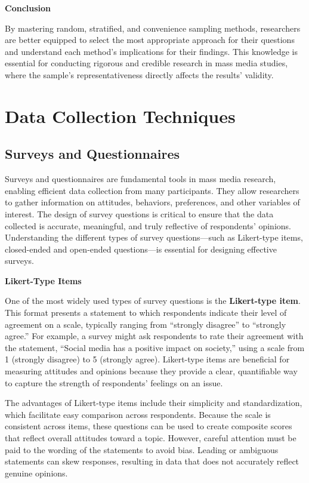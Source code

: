 \documentclass[
]{book}
\begin{document}
\textbf{Conclusion}

By mastering random, stratified, and convenience sampling methods, researchers are better equipped to select the most appropriate approach for their questions and understand each method's implications for their findings. This knowledge is essential for conducting rigorous and credible research in mass media studies, where the sample's representativeness directly affects the results' validity.

\section{Data Collection Techniques}\label{data-collection-techniques}

\subsection*{Surveys and Questionnaires}\label{surveys-and-questionnaires}

Surveys and questionnaires are fundamental tools in mass media research, enabling efficient data collection from many participants. They allow researchers to gather information on attitudes, behaviors, preferences, and other variables of interest. The design of survey questions is critical to ensure that the data collected is accurate, meaningful, and truly reflective of respondents' opinions. Understanding the different types of survey questions---such as Likert-type items, closed-ended and open-ended questions---is essential for designing effective surveys.

\textbf{Likert-Type Items}

One of the most widely used types of survey questions is the \textbf{Likert-type item}. This format presents a statement to which respondents indicate their level of agreement on a scale, typically ranging from ``strongly disagree'' to ``strongly agree.'' For example, a survey might ask respondents to rate their agreement with the statement, ``Social media has a positive impact on society,'' using a scale from 1 (strongly disagree) to 5 (strongly agree). Likert-type items are beneficial for measuring attitudes and opinions because they provide a clear, quantifiable way to capture the strength of respondents' feelings on an issue.

The advantages of Likert-type items include their simplicity and standardization, which facilitate easy comparison across respondents. Because the scale is consistent across items, these questions can be used to create composite scores that reflect overall attitudes toward a topic. However, careful attention must be paid to the wording of the statements to avoid bias. Leading or ambiguous statements can skew responses, resulting in data that does not accurately reflect genuine opinions.
\end{document}
